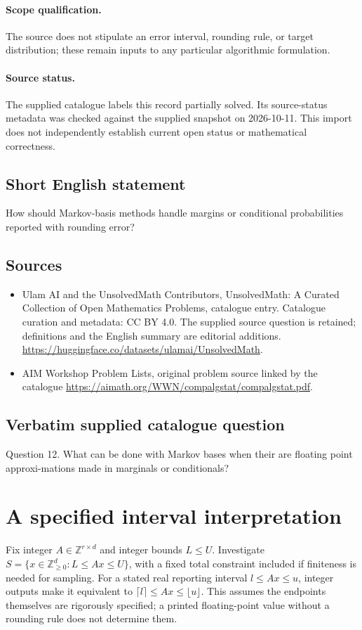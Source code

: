 \documentclass[11pt]{article}
\begin{document}
\paragraph{Scope qualification.}
The source does not stipulate an error interval, rounding rule, or target distribution; these remain inputs to any particular algorithmic formulation.
\paragraph{Source status.}
The supplied catalogue labels this record partially solved. Its source-status metadata was checked against the supplied snapshot on 2026-10-11. This import does not independently establish current open status or mathematical correctness.
\subsection{Short English statement}
How should Markov-basis methods handle margins or conditional probabilities reported with rounding error?
\subsection{Sources}
\begin{itemize}
\item[S1] Ulam AI and the UnsolvedMath Contributors, UnsolvedMath: A Curated Collection of Open Mathematics Problems, catalogue entry. Catalogue curation and metadata: CC BY 4.0. The supplied source question is retained; definitions and the English summary are editorial additions.
\url{https://huggingface.co/datasets/ulamai/UnsolvedMath}.
\item[S2] AIM Workshop Problem Lists, original problem source linked by the catalogue
\url{https://aimath.org/WWN/compalgstat/compalgstat.pdf}.
\end{itemize}
\subsection{Verbatim supplied catalogue question}
Question 12. What can be done with Markov bases when their are floating point approxi-mations made in marginals or conditionals?

\section{A specified interval interpretation}
Fix integer $A\in\mathbb Z^{r\times d}$ and integer bounds $L\le U$.
Investigate $S=\{x\in\mathbb Z_{\ge0}^d:L\le Ax\le U\}$, with a
fixed total constraint included if finiteness is needed for sampling.
For a stated real reporting interval $l\le Ax\le u$, integer outputs
make it equivalent to $\lceil l\rceil\le Ax\le\lfloor u\rfloor$.
This assumes the endpoints themselves are rigorously specified; a printed
floating-point value without a rounding rule does not determine them.
\end{document}
